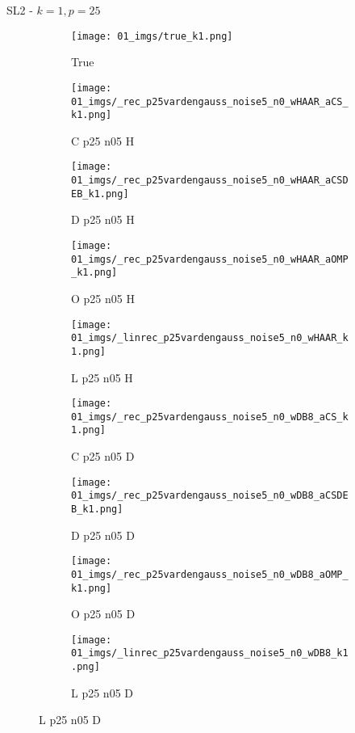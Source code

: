 \begin{frame}{SL2 - $k=1,p=25$}{}
\begin{figure}
\begin{subfigure}{0.1\textwidth}
\texttt{[image: 01\_imgs/true\_k1.png]}
\caption*{\Tiny True}
\end{subfigure}
\begin{subfigure}{0.1\textwidth}
\texttt{[image: 01\_imgs/\_rec\_p25vardengauss\_noise5\_n0\_wHAAR\_aCS\_k1.png]}
\caption*{\Tiny C p25 n05 H}
\end{subfigure}
\begin{subfigure}{0.1\textwidth}
\texttt{[image: 01\_imgs/\_rec\_p25vardengauss\_noise5\_n0\_wHAAR\_aCSDEB\_k1.png]}
\caption*{\Tiny D p25 n05 H}
\end{subfigure}
\begin{subfigure}{0.1\textwidth}
\texttt{[image: 01\_imgs/\_rec\_p25vardengauss\_noise5\_n0\_wHAAR\_aOMP\_k1.png]}
\caption*{\Tiny O p25 n05 H}
\end{subfigure}
\begin{subfigure}{0.1\textwidth}
\texttt{[image: 01\_imgs/\_linrec\_p25vardengauss\_noise5\_n0\_wHAAR\_k1.png]}
\caption*{\Tiny L p25 n05 H}
\end{subfigure}
\begin{subfigure}{0.1\textwidth}
\texttt{[image: 01\_imgs/\_rec\_p25vardengauss\_noise5\_n0\_wDB8\_aCS\_k1.png]}
\caption*{\Tiny C p25 n05 D}
\end{subfigure}
\begin{subfigure}{0.1\textwidth}
\texttt{[image: 01\_imgs/\_rec\_p25vardengauss\_noise5\_n0\_wDB8\_aCSDEB\_k1.png]}
\caption*{\Tiny D p25 n05 D}
\end{subfigure}
\begin{subfigure}{0.1\textwidth}
\texttt{[image: 01\_imgs/\_rec\_p25vardengauss\_noise5\_n0\_wDB8\_aOMP\_k1.png]}
\caption*{\Tiny O p25 n05 D}
\end{subfigure}
\begin{subfigure}{0.1\textwidth}
\texttt{[image: 01\_imgs/\_linrec\_p25vardengauss\_noise5\_n0\_wDB8\_k1.png]}
\caption*{\Tiny L p25 n05 D}
\end{subfigure}

\vspace{5pt}


\end{figure}
\end{frame}
